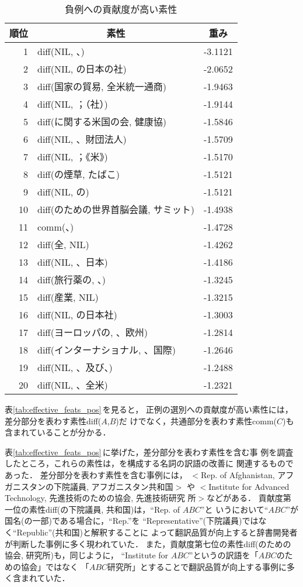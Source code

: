 \begin{table}[htbp]
\caption{負例への貢献度が高い素性}
\label{tab:effective_feats_neg}
\begin{center}
\begin{tabular}{|r|l|c|}\hline
\multicolumn{1}{|c}{順位} & \multicolumn{1}{|c|}{素性} & 重み \\\hline
1 & diff(NIL, 、) & -3.1121 \\
2 & diff(NIL, の日本の社) & -2.0652 \\
3 & diff(国家の貿易, 全米統一通商) & -1.9463 \\
4 & diff(NIL, ；（社）) & -1.9144 \\
5 & diff(に関する米国の会, 健康協) & -1.5846 \\
6 & diff(NIL, 、財団法人) & -1.5709 \\
7 & diff(NIL, ；《米》) & -1.5170 \\
8 & diff(の煙草, たばこ) & -1.5121 \\
9 & diff(NIL, の) & -1.5121 \\
10 & diff(のための世界首脳会議, サミット) & -1.4938 \\
11 & comm(、) & -1.4728 \\
12 & diff(全, NIL) & -1.4262 \\
13 & diff(NIL, 、日本) & -1.4186 \\
14 & diff(旅行薬の, 、) & -1.3245 \\
15 & diff(産業, NIL) & -1.3215 \\
16 & diff(NIL, の日本社) & -1.3003 \\
17 & diff(ヨーロッパの, 、欧州) & -1.2814 \\
18 & diff(インターナショナル, 、国際) & -1.2646 \\
19 & diff(NIL, 、及び、) & -1.2488 \\
20 & diff(NIL, 、全米) & -1.2321 \\\hline
\end{tabular}
\end{center}
\end{table}

表\ref{tab:effective_feats_pos}\,を見ると，
正例の選別への貢献度が高い素性には，差分部分を表わす素性diff($A$,$B$)だ
けでなく，共通部分を表わす素性comm($C$)も含まれていることが分かる．

表\ref{tab:effective_feats_pos}\,に挙げた，差分部分を表わす素性を含む事
例を調査したところ，これらの素性は，{\ENP}を構成する名詞の訳語の改善に
関連するものであった．
差分部分を表わす素性を含む事例には，
$<$Rep. of Afghanistan, アフガニスタンの下院議員, アフガニスタン共和国$>$
や
$<$Institute for Advanced Technology, 先進技術のための協会, 先進技術研究
所$>$などがある．
貢献度第一位の素性diff(の下院議員, 共和国)は，``Rep. of $ABC$''と
いう{\ENP}において``$ABC$''が国名(の一部)である場合に，``Rep.''を
``Representative''(下院議員)ではなく``Republic''(共和国)と解釈することに
よって翻訳品質が向上すると辞書開発者が判断した事例に多く現われていた．
また，貢献度第七位の素性diff(のための協会, 研究所)も，同じように，
``Institute for $ABC$''という{\ENP}の訳語を「$ABC$のための協会」ではなく
「$ABC$研究所」とすることで翻訳品質が向上する事例に多く含まれていた．

